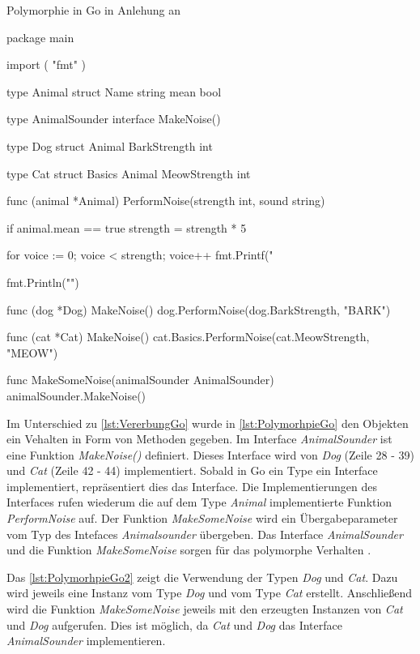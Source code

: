 \begin{listing}[H]
\caption{Polymorphie in Go in Anlehung an \cite[]{WilliamKennedy.2013}}
\label{lst:PolymorhpieGo}
\begin{GoCode}
package main

import (
    "fmt"
)

type Animal struct {
    Name string
    mean bool
}

type AnimalSounder interface {
    MakeNoise()
}

type Dog struct {
    Animal
    BarkStrength int
}

type Cat struct {
    Basics Animal
    MeowStrength int
}

func (animal *Animal) PerformNoise(strength int, sound string) {
    if animal.mean == true {
        strength = strength * 5
    }

    for voice := 0; voice < strength; voice++ {
        fmt.Printf("%
    }

    fmt.Println("")
}

func (dog *Dog) MakeNoise() {
    dog.PerformNoise(dog.BarkStrength, "BARK")
}

func (cat *Cat) MakeNoise() {
    cat.Basics.PerformNoise(cat.MeowStrength, "MEOW")
}

func MakeSomeNoise(animalSounder AnimalSounder) {
    animalSounder.MakeNoise()
}
\end{GoCode}
\end{listing}

Im Unterschied zu \autoref{lst:VererbungGo} wurde in \autoref{lst:PolymorhpieGo} den Objekten ein Vehalten in Form von Methoden gegeben.
Im Interface \emph{AnimalSounder} ist eine Funktion \emph{MakeNoise()} definiert. 
Dieses Interface wird von \emph{Dog} (Zeile 28 - 39) und \emph{Cat} (Zeile 42 - 44) implementiert. 
Sobald in Go ein Type ein Interface implementiert, repräsentiert dies das Interface. 
Die Implementierungen des Interfaces rufen wiederum die auf dem Type \emph{Animal} implementierte Funktion \emph{PerformNoise} auf.
Der Funktion \emph{MakeSomeNoise} wird ein Übergabeparameter vom Typ des Intefaces \emph{Animalsounder} übergeben. 
Das Interface \emph{AnimalSounder} und die Funktion \emph{MakeSomeNoise} sorgen für das polymorphe Verhalten \cite[]{WilliamKennedy.2013}.  

Das \autoref{lst:PolymorhpieGo2} zeigt die Verwendung der Typen \emph{Dog} und \emph{Cat}.
Dazu wird jeweils eine Instanz vom Type \emph{Dog} und vom Type \emph{Cat} erstellt. 
Anschließend wird die Funktion \emph{MakeSomeNoise} jeweils mit den erzeugten Instanzen von \emph{Cat} und \emph{Dog} aufgerufen. 
Dies ist möglich, da \emph{Cat} und \emph{Dog} das Interface \emph{AnimalSounder} implementieren. 

